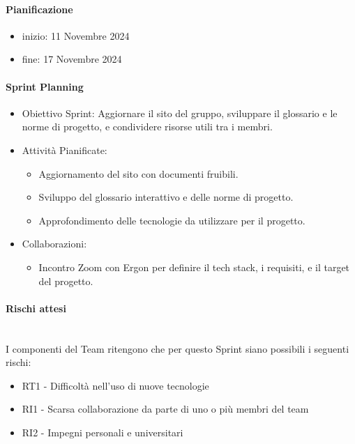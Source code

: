 \documentclass{article}
\begin{document}
                \paragraph{Pianificazione}
                \begin{itemize}
                    \item inizio: 11 Novembre 2024
                    \item fine: 17 Novembre 2024
                \end{itemize}
                \paragraph{Sprint Planning}
                    \begin{itemize}
                        \item Obiettivo Sprint: Aggiornare il sito del gruppo, sviluppare il glossario e le norme di progetto, e condividere risorse utili tra i membri.
                        \item Attività Pianificate:
                            \begin{itemize}
                                \item Aggiornamento del sito con documenti fruibili.
                                \item Sviluppo del glossario interattivo e delle norme di progetto.
                                \item Approfondimento delle tecnologie da utilizzare per il progetto.
                            \end{itemize}
                        \item Collaborazioni:
                            \begin{itemize}
                                \item Incontro Zoom con Ergon per definire il tech stack, i requisiti, e il target del progetto.
                            \end{itemize}
                    \end{itemize}

                    \paragraph{Rischi attesi}\mbox{}\\
                    I componenti del Team ritengono che per questo Sprint siano possibili i seguenti rischi:
                    \begin{itemize}
                        \item RT1 - Difficoltà nell’uso di nuove tecnologie
                        \item RI1 - Scarsa collaborazione da parte di uno o più membri del team
                        \item RI2 - Impegni personali e universitari
                    \end{itemize}
\end{document}
